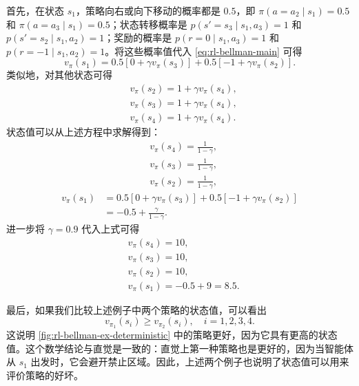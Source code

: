 \begin{example}[随机策略]
首先，在状态 $s_1$，策略向右或向下移动的概率都是 $0.5$，即 $\pi(a = a_2 \mid s_1) = 0.5$ 和 $\pi(a = a_3 \mid s_1) = 0.5$；状态转移概率是 $p(s' = s_3 \mid s_1, a_3) = 1$ 和 $p(s' = s_2 \mid s_1, a_2) = 1$；奖励的概率是 $p(r = 0 \mid s_1, a_3) = 1$ 和 $p(r = -1 \mid s_1, a_2) = 1$。将这些概率值代入 \cref{eq:rl-bellman-main} 可得
\begin{equation*}
v_\pi(s_1) = 0.5 [0 + \gamma v_\pi(s_3)] + 0.5 [-1 + \gamma v_\pi(s_2)].
\end{equation*}
类似地，对其他状态可得
\begin{equation*}
\begin{aligned}
& v_\pi(s_2) = 1 + \gamma v_\pi(s_4), \\
& v_\pi(s_3) = 1 + \gamma v_\pi(s_4), \\
& v_\pi(s_4) = 1 + \gamma v_\pi(s_4).
\end{aligned}
\end{equation*}
状态值可以从上述方程中求解得到：
\begin{equation*}
\begin{aligned}
& v_\pi(s_4) = \frac{1}{1 - \gamma}, \\
& v_\pi(s_3) = \frac{1}{1 - \gamma}, \\
& v_\pi(s_2) = \frac{1}{1 - \gamma},
\end{aligned}
\end{equation*}
\begin{equation*}
\begin{aligned}
v_\pi(s_1) &= 0.5 [0 + \gamma v_\pi(s_3)] + 0.5 [-1 + \gamma v_\pi(s_2)] \\
&= -0.5 + \frac{\gamma}{1 - \gamma}.
\end{aligned}
\end{equation*}
进一步将 $\gamma = 0.9$ 代入上式可得
\begin{equation*}
\begin{aligned}
& v_\pi(s_4) = 10, \\
& v_\pi(s_3) = 10, \\
& v_\pi(s_2) = 10, \\
& v_\pi(s_1) = -0.5 + 9 = 8.5.
\end{aligned}
\end{equation*}
\end{example}

最后，如果我们比较上述例子中两个策略的状态值，可以看出
\begin{equation*}
v_{\pi_1}(s_i) \geqslant v_{\pi_2}(s_i), \quad i = 1, 2, 3, 4.
\end{equation*}
这说明 \cref{fig:rl-bellman-ex-deterministic} 中的策略更好，因为它具有更高的状态值。这个数学结论与直觉是一致的：直觉上第一种策略也是更好的，因为当智能体从 $s_1$ 出发时，它会避开禁止区域。因此，上述两个例子也说明了状态值可以用来评价策略的好坏。

